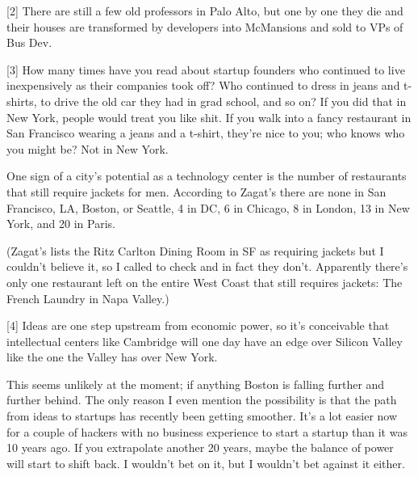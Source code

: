 [2] There are still a few old professors in Palo Alto, but one
                  by one they die and their houses are transformed by developers
                  into McMansions and sold to VPs of Bus Dev.

[3] How many times have you read about startup founders who
                  continued to live inexpensively as their companies took off?
                  Who continued to dress in jeans and t-shirts, to drive the old
                  car they had in grad school, and so on? If you did that in New
                  York, people would treat you like shit. If you walk into a
                  fancy restaurant in San Francisco wearing a jeans and a
                  t-shirt, they're nice to you; who knows who you might be? Not
                  in New York.

One sign of a city's potential as a
                  technology center is the number of restaurants that still
                  require jackets for men. According to Zagat's there are none
                  in San Francisco, LA, Boston, or Seattle, 4 in DC, 6 in
                  Chicago, 8 in London, 13 in New York, and 20 in Paris.

(Zagat's
                  lists the Ritz Carlton Dining Room in SF as requiring jackets
                  but I couldn't believe it, so I called to check and in fact
                  they don't. Apparently there's only one restaurant left on the
                  entire West Coast that still requires jackets: The French
                  Laundry in Napa Valley.)

[4] Ideas are one step upstream from economic power, so it's
                  conceivable that intellectual centers like Cambridge will one
                  day have an edge over Silicon Valley like the one the Valley
                  has over New York.

This seems unlikely at the
                  moment; if anything Boston is falling further and further
                  behind. The only reason I even mention the possibility is that
                  the path from ideas to startups has recently been getting
                  smoother. It's a lot easier now for a couple of hackers with
                  no business experience to start a startup than it was 10 years
                  ago. If you extrapolate another 20 years, maybe the balance of
                  power will start to shift back. I wouldn't bet on it, but I
                  wouldn't bet against it either.


